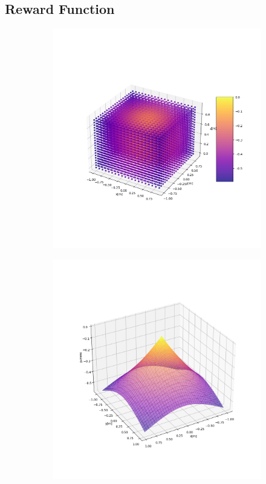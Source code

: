 \subsection{Reward Function}
\begin{figure}
	\centering
	\begin{subfigure}{0.32\linewidth}
		\includegraphics[width=\linewidth]{figures/rew3d.png}
		\caption{}
	\end{subfigure}
	\begin{subfigure}{0.32\linewidth}
		\includegraphics[width=\linewidth]{figures/rewXY.png}

\end{subfigure}
\end{figure}
